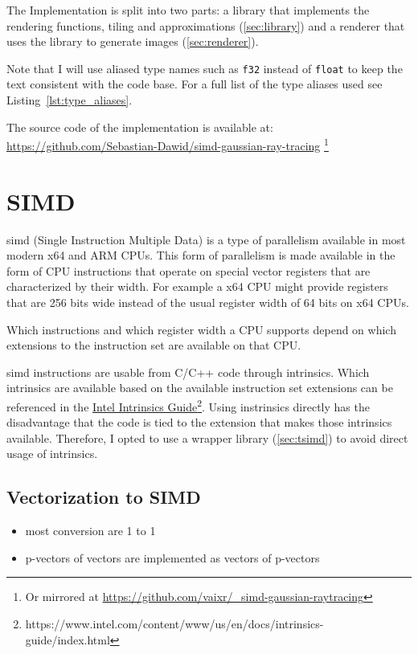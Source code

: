 \documentclass[a4paper, 11pt]{memoir}
\begin{document}
    The Implementation is split into two parts: a library that implements the rendering functions, tiling and approximations
    (\ref{sec:library}) and a renderer that uses the library to generate images (\ref{sec:renderer}).

    Note that I will use aliased type names such as \texttt{f32} instead of \texttt{float} to keep the
    text consistent with the code base. For a full list of the type aliases used see Listing~\ref{lst:type_aliases}.

    The source code of the implementation is available at: \\
    \href{https://github.com/Sebastian-Dawid/simd-gaussian-ray-tracing}{https://github.com/Sebastian-Dawid/simd-gaussian-ray-tracing}
    \footnote{Or mirrored at \href{https://github.com/vaixr/_simd-gaussian-raytracing}{https://github.com/vaixr/\_simd-gaussian-raytracing}}

    \section{SIMD}
    \label{sec:simd}
    \gls{simd} (Single Instruction Multiple Data) is a type of parallelism available in most modern x64 and ARM CPUs. This
    form of parallelism is made available in the form of CPU instructions that operate on special vector registers that
    are characterized by their width. For example a x64 CPU might provide registers that are 256 bits wide instead of
    the usual register width of 64 bits on x64 CPUs.

    Which instructions and which register width a CPU supports depend on which extensions to the instruction set are
    available on that CPU.

    \gls{simd} instructions are usable from C/C++ code through intrinsics. Which intrinsics are available based on the
    available instruction set extensions can be referenced in the
    \href{https://www.intel.com/content/www/us/en/docs/intrinsics-guide/index.html}{Intel Intrinsics
    Guide}\footnote{https://www.intel.com/content/www/us/en/docs/intrinsics-guide/index.html}. Using instrinsics
    directly has the disadvantage that the code is tied to the extension that makes those intrinsics available.
    Therefore, I opted to use a wrapper library (\ref{sec:tsimd}) to avoid direct usage of intrinsics.

    \subsection{Vectorization to SIMD}
    \label{sec:vectorization_to_simd}
    \begin{itemize}
        \item most conversion are 1 to 1
        \item p-vectors of vectors are implemented as vectors of p-vectors
    \end{itemize}
\end{document}
